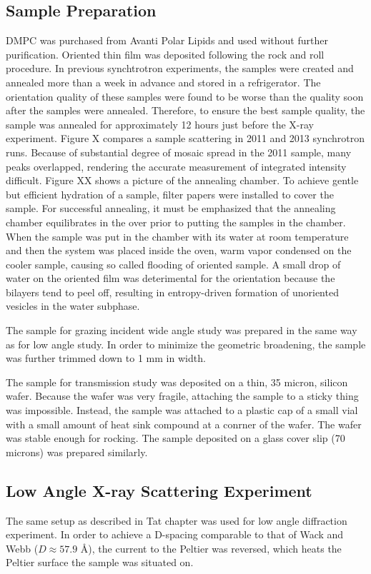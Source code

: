 \subsection{Sample Preparation}
DMPC was purchased from Avanti Polar Lipids and used without further purification.
Oriented thin film was deposited following the rock and roll procedure.  
In previous synchtrotron experiments, the samples were created and annealed 
more than a week in advance and stored in a refrigerator. The orientation
quality of these samples were found to be worse than the quality soon after
the samples were annealed. Therefore, to ensure the best sample quality, the 
sample was annealed for approximately 12 hours just before the X-ray experiment.
Figure X compares a sample scattering in 2011 and 2013 synchrotron runs. 
Because of substantial degree of mosaic spread in the 2011 sample, many peaks
overlapped, rendering the accurate measurement of integrated intensity difficult.
Figure XX shows a picture of the annealing chamber. To achieve gentle but
efficient hydration of a sample, filter papers were installed to cover the 
sample. For successful annealing, it must be emphasized that the annealing 
chamber equilibrates in the over prior to putting the samples in the chamber.
When the sample was put in the chamber with its water at room temperature and
then the system was placed inside the oven, warm vapor condensed on the cooler
sample, causing so called flooding of oriented sample. A small drop of water
on the oriented film was deterimental for the orientation because the bilayers
tend to peel off, resulting in entropy-driven formation of unoriented vesicles 
in the water subphase. 

The sample for grazing incident wide angle study was prepared in the same way 
as for low angle study. In order to minimize the geometric broadening, the 
sample was further trimmed down to 1 mm in width.

The sample for transmission study was deposited on a thin, 35 micron, silicon
wafer. Because the wafer was very fragile, attaching the sample to a sticky 
thing was impossible. Instead, the sample was attached to a plastic cap of 
a small vial with a small amount of heat sink compound at a conrner of the 
wafer. The wafer was stable enough for rocking. The sample deposited on a 
glass cover slip (70 microns) was prepared similarly.  

\subsection{Low Angle X-ray Scattering Experiment}
The same setup as described in Tat chapter was used for low angle diffraction
experiment. In order to achieve a D-spacing comparable to that of Wack and Webb
($D \approx 57.9$ \AA), the current to the Peltier was reversed, which heats the 
Peltier surface the sample was situated on. 

